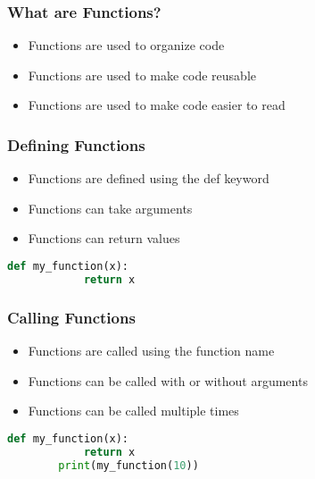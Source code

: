 \documentclass[serif, 9pt, aspectratio=32]{beamer}
\begin{document}
\begin{frame}
    \centering
    \frametitle{What are Functions?}
    \begin{itemize}
        \setlength{\itemsep}{3em}
        \item Functions are used to organize code
        \item Functions are used to make code reusable
        \item Functions are used to make code easier to read
    \end{itemize}
\end{frame}

\begin{frame}
    \centering
    \frametitle{Defining Functions}
    \begin{itemize}
        \setlength{\itemsep}{3em}
        \item Functions are defined using the def keyword
        \item Functions can take arguments
        \item Functions can return values
    \end{itemize}
\end{frame}

\begin{frame}[fragile]
    \begin{lstlisting}[language=Python]
        def my_function(x):
            return x
    \end{lstlisting}
\end{frame}

\begin{frame}
    \centering
    \frametitle{Calling Functions}
    \begin{itemize}
        \setlength{\itemsep}{3em}
        \item Functions are called using the function name
        \item Functions can be called with or without arguments
        \item Functions can be called multiple times
    \end{itemize}
\end{frame}

\begin{frame}[fragile]
    \begin{lstlisting}[language=Python]
        def my_function(x):
            return x
        print(my_function(10))
    \end{lstlisting}
\end{frame}
\end{document}

